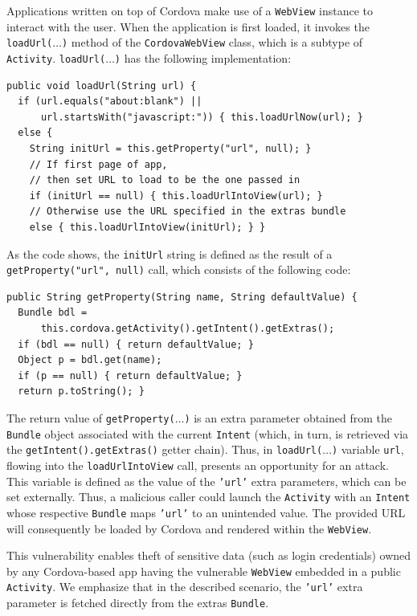 Applications written on top of Cordova make use of a {\tt WebView} instance to interact with the user. When the application is first loaded, it invokes the {\tt loadUrl($\ldots$)} method of the {\tt CordovaWebView} class, which is a subtype of {\tt Activity}. {\tt loadUrl($\ldots$)} has the following implementation:
\begin{small}
\begin{lstlisting}[showstringspaces=false]
public void loadUrl(String url) {
  if (url.equals("about:blank") || 
      url.startsWith("javascript:")) { this.loadUrlNow(url); }
  else {
    String initUrl = this.getProperty("url", null); }
    // If first page of app, 
    // then set URL to load to be the one passed in
    if (initUrl == null) { this.loadUrlIntoView(url); }
    // Otherwise use the URL specified in the extras bundle
    else { this.loadUrlIntoView(initUrl); } }
\end{lstlisting}
\end{small}
As the code shows, the {\tt initUrl} string is defined as the result of a  {\tt getProperty("url", null)} call, which consists of the following code:
\begin{small}
\begin{lstlisting}[showstringspaces=false]
public String getProperty(String name, String defaultValue) {
  Bundle bdl = 
      this.cordova.getActivity().getIntent().getExtras();
  if (bdl == null) { return defaultValue; }
  Object p = bdl.get(name);
  if (p == null) { return defaultValue; }
  return p.toString(); }
\end{lstlisting}
\end{small}
The return value of {\tt getProperty($\ldots$)} is an extra parameter obtained from the {\tt Bundle} object associated with the current {\tt Intent} (which, in turn, is retrieved via the {\tt getIntent().getExtras()} getter chain). Thus, in {\tt loadUrl($\ldots$)} variable {\tt url}, flowing into the {\tt loadUrlIntoView} call, presents an opportunity for an attack. This variable is defined
as the value of the {\tt 'url'} extra parameters, which can be set externally.  
Thus, a malicious caller could launch the {\tt Activity} with an {\tt Intent} whose respective {\tt Bundle} maps {\tt 'url'} to an unintended value. The provided URL will consequently be loaded by Cordova and rendered within the {\tt WebView}.

This vulnerability enables theft of sensitive data (such as login credentials) owned by any Cordova-based app having the vulnerable {\tt WebView} embedded in a public {\tt Activity}.
We emphasize that in the described scenario, the {\tt 'url'} extra parameter is fetched directly from the extras {\tt Bundle}. 

